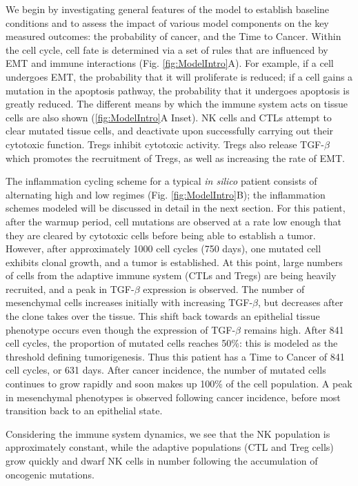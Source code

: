 \documentclass[11pt]{article}
\begin{document}
We begin by investigating general features of the model to establish baseline conditions and to assess the impact of various model components on the key measured outcomes: the probability of cancer, and the Time to Cancer. 
Within the cell cycle, cell fate is determined via a set of rules that are influenced by EMT and immune interactions (Fig. \ref{fig:ModelIntro}A). For example, if a cell undergoes EMT, the probability that it will proliferate is reduced; if a cell gains a mutation in the apoptosis pathway, the probability that it undergoes apoptosis is greatly reduced. The different means by which the immune system acts on tissue cells are also shown (\ref{fig:ModelIntro}A Inset). NK cells and CTLs attempt to clear mutated tissue cells, and deactivate upon successfully carrying out their cytotoxic function. Tregs inhibit cytotoxic activity. Tregs also release TGF-$\beta$ which promotes the recruitment of Tregs, as well as increasing the rate of EMT.
\par
The inflammation cycling scheme for a typical {\it in silico} patient consists of alternating high and low regimes (Fig. \ref{fig:ModelIntro}B); the inflammation schemes modeled will be discussed in detail in the next section. For this patient, after the warmup period, cell mutations are observed at a rate low enough that they are cleared by cytotoxic cells before being able to establish a tumor. However, after approximately 1000 cell cycles (750 days), one mutated cell exhibits clonal growth, and a tumor is established. At this point, large numbers of cells from the adaptive immune system (CTLs and Tregs) are being heavily recruited, and a peak in TGF-$\beta$ expression is observed. The number of mesenchymal cells increases initially with increasing TGF-$\beta$, but decreases after the clone takes over the tissue. This shift back towards an epithelial tissue phenotype occurs even though the expression of TGF-$\beta$ remains high.
After 841 cell cycles, the proportion of mutated cells reaches 50\%: this is modeled as the threshold defining tumorigenesis. Thus this patient has a Time to Cancer of 841 cell cycles, or 631 days. 
After cancer incidence, the number of mutated cells continues to grow rapidly and soon makes up 100\% of the cell population. A peak in mesenchymal phenotypes is observed following cancer incidence, before most transition back to an epithelial state.
\par 
Considering the immune system dynamics, we see that the NK population is approximately constant, while the adaptive populations (CTL and Treg cells) grow quickly and dwarf NK cells in number following the accumulation of oncogenic mutations.
\end{document}

